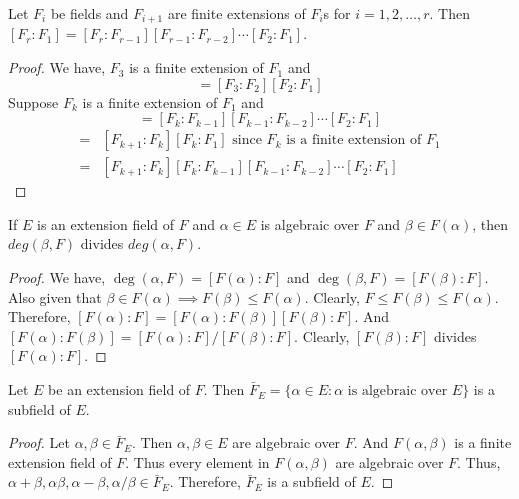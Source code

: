 \begin{corollary}
	Let $F_i$ be fields and $F_{i+1}$ are finite extensions of $F_i$s for $i = 1,2,\dots,r$.
	Then $[F_r : F_1] = [F_r : F_{r-1}][F_{r-1}:F_{r-2}] \dotsm [F_2:F_1]$.
\end{corollary}
\begin{proof}
	We have, $F_3$ is a finite extension of $F_1$ and 
	\begin{equation}
		[F_3:F_1] = [F_3:F_2][F_2:F_1]
	\end{equation}
	Suppose $F_k$ is a finite extension of $F_1$ and 
	\begin{equation}
		[F_k : F_1] = [F_k:F_{k-1}][F_{k-1}:F_{k-2}] \dotsm [F_2:F_1]
	\end{equation}
	\begin{align*}
		[F_{k+1}:F_1] = & [F_{k+1} : F_k][F_k : F_1] \text{ since } F_k \text{ is a finite extension of } F_1\\
		= & [F_{k+1}:F_k][F_k:F_{k-1}][F_{k-1}:F_{k-2}] \dotsm [F_2:F_1]
	\end{align*}
\end{proof}

\begin{corollary}
	If $E$ is an extension field of $F$ and $\alpha \in E$ is algebraic over $F$ and $\beta \in F(\alpha)$, then $deg(\beta,F)$ divides $deg(\alpha,F)$.
\end{corollary}
\begin{proof}
	We have, $\deg(\alpha,F) = [F(\alpha) : F]$ and $\deg(\beta,F) = [F(\beta):F]$.
	Also given that $\beta \in F(\alpha) \implies F(\beta) \le F(\alpha)$.
	Clearly, $F \le F(\beta) \le F(\alpha)$.
	Therefore, $[F(\alpha) : F] = [F(\alpha):F(\beta)][F(\beta):F]$.
	And $[F(\alpha):F(\beta)] = [F(\alpha):F]/[F(\beta):F]$.
	Clearly, $[F(\beta):F]$ divides $[F(\alpha):F]$.
\end{proof}

\begin{theorem}
	Let $E$ be an extension field of $F$.
	Then $\bar{F}_E = \{ \alpha \in E : \alpha \text{ is algebraic over } E \}$ is a subfield of $E$.
\end{theorem}
\begin{proof}
	Let $\alpha,\beta \in \bar{F}_E$.
	Then $\alpha,\beta \in E$ are algebraic over $F$.
	And $F(\alpha,\beta)$ is a finite extension field of $F$.
	Thus every element in $F(\alpha,\beta)$ are algebraic over $F$.
	Thus, $\alpha+\beta, \alpha\beta,\alpha-\beta,\alpha/\beta \in \bar{F}_E$.
	Therefore, $\bar{F}_E$ is a subfield of $E$.
\end{proof}

